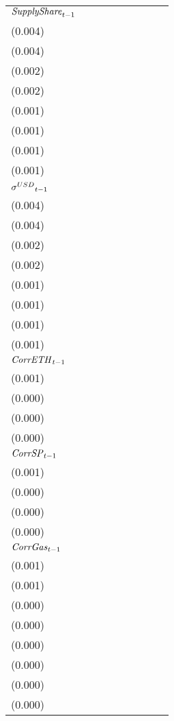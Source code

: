 \begin{tabular}{lllllllll}
${{\it SupplyShare}}_{t-1}$  &   \makecell{$0.038^{***}$ \\(0.004)} &  \makecell{$0.038^{***}$ \\(0.004)} &   \makecell{$0.008^{***}$ \\(0.002)} &   \makecell{$0.008^{***}$ \\(0.002)} &   \makecell{$0.005^{***}$ \\(0.001)} &   \makecell{$0.005^{***}$ \\(0.001)} &  \makecell{$0.014^{***}$ \\(0.001)} &  \makecell{$0.014^{***}$ \\(0.001)} \\
${{\it \sigma}^{USD}}_{t-1}$ &   \makecell{$0.012^{***}$ \\(0.004)} &  \makecell{$0.015^{***}$ \\(0.004)} &     \makecell{$-0.000^{}$ \\(0.002)} &     \makecell{$-0.000^{}$ \\(0.002)} &     \makecell{$-0.000^{}$ \\(0.001)} &     \makecell{$-0.000^{}$ \\(0.001)} &     \makecell{$0.001^{}$ \\(0.001)} &     \makecell{$0.002^{}$ \\(0.001)} \\
${{\it CorrETH}}_{t-1}$      &  \makecell{$-0.004^{***}$ \\(0.001)} &                                     &      \makecell{$0.000^{}$ \\(0.000)} &                                      &     \makecell{$-0.000^{}$ \\(0.000)} &                                      &    \makecell{$-0.000^{}$ \\(0.000)} &                                     \\
${{\it CorrSP}}_{t-1}$       &                                      &  \makecell{$-0.002^{**}$ \\(0.001)} &                                      &     \makecell{$-0.000^{}$ \\(0.000)} &                                      &     \makecell{$-0.000^{}$ \\(0.000)} &                                     &     \makecell{$0.000^{}$ \\(0.000)} \\
${{\it CorrGas}}_{t-1}$      &     \makecell{$-0.001^{}$ \\(0.001)} &    \makecell{$-0.001^{}$ \\(0.001)} &     \makecell{$-0.000^{}$ \\(0.000)} &     \makecell{$-0.000^{}$ \\(0.000)} &     \makecell{$-0.000^{}$ \\(0.000)} &     \makecell{$-0.000^{}$ \\(0.000)} &    \makecell{$-0.000^{}$ \\(0.000)} &    \makecell{$-0.000^{}$ \\(0.000)} \\

\end{tabular}
